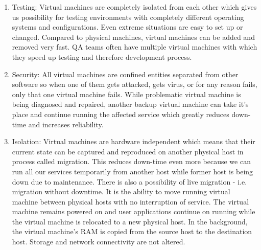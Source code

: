 \begin{enumerate}
\item Testing: Virtual machines are completely isolated from each other which gives us possibility for testing environments with completely different operating systems and configurations. Even extreme situations are easy to set up or changed. Compared to physical machines, virtual machines can be added and removed very fast. QA teams often have multiple virtual machines with which they speed up testing and therefore development process.
\item Security: All virtual machines are confined entities separated from other software so when one of them gets attacked, gets virus, or for any reason fails, only that one virtual machine fails. While problematic virtual machine is being diagnosed and repaired, another backup virtual machine can take it's place and continue running the affected service which greatly reduces down-time and increases reliability.
\item \label{live-migration} Isolation: Virtual machines are hardware independent which means that their current state can be captured and reproduced on another physical host in process called migration. This reduces down-time even more because we can run all our services temporarily from another host while former host is being down due to maintenance. There is also a possibility of live migration - i.e. migration without downtime. It is the ability to move running virtual machine between physical hosts with no interruption of service. The virtual machine remains powered on and user applications continue on running while the virtual machine is relocated to a new physical host. In the background, the virtual machine's RAM is copied from the source host to the destination host. Storage and network connectivity are not altered.
\end{enumerate}

